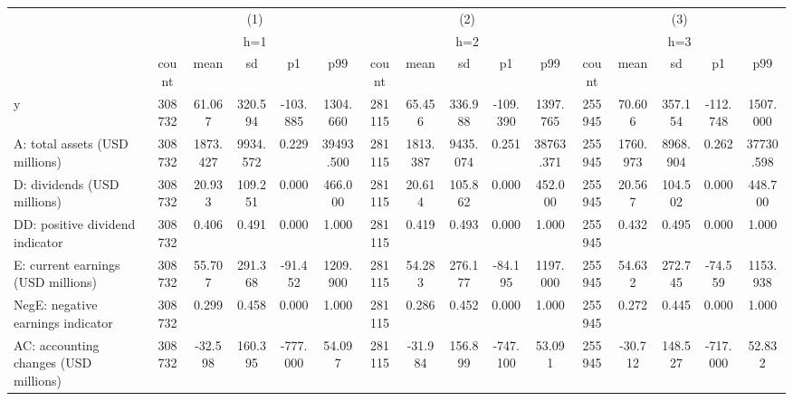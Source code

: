 \begin{tabular}{l*{3}{ccccc}}
\hline\hline
                    &\multicolumn{5}{c}{(1)}                                         &\multicolumn{5}{c}{(2)}                                         &\multicolumn{5}{c}{(3)}                                         \\
                    &\multicolumn{5}{c}{h=1}                                         &\multicolumn{5}{c}{h=2}                                         &\multicolumn{5}{c}{h=3}                                         \\
                    &       count&        mean&          sd&          p1&         p99&       count&        mean&          sd&          p1&         p99&       count&        mean&          sd&          p1&         p99\\
\hline
y                   &      308732&      61.067&     320.594&    -103.885&    1304.660&      281115&      65.456&     336.988&    -109.390&    1397.765&      255945&      70.606&     357.154&    -112.748&    1507.000\\
A: total assets (USD millions)&      308732&    1873.427&    9934.572&       0.229&   39493.500&      281115&    1813.387&    9435.074&       0.251&   38763.371&      255945&    1760.973&    8968.904&       0.262&   37730.598\\
D: dividends (USD millions)&      308732&      20.933&     109.251&       0.000&     466.000&      281115&      20.614&     105.862&       0.000&     452.000&      255945&      20.567&     104.502&       0.000&     448.700\\
DD: positive dividend indicator&      308732&       0.406&       0.491&       0.000&       1.000&      281115&       0.419&       0.493&       0.000&       1.000&      255945&       0.432&       0.495&       0.000&       1.000\\
E: current earnings (USD millions)&      308732&      55.707&     291.368&     -91.452&    1209.900&      281115&      54.283&     276.177&     -84.195&    1197.000&      255945&      54.632&     272.745&     -74.559&    1153.938\\
NegE: negative earnings indicator&      308732&       0.299&       0.458&       0.000&       1.000&      281115&       0.286&       0.452&       0.000&       1.000&      255945&       0.272&       0.445&       0.000&       1.000\\
AC: accounting changes (USD millions)&      308732&     -32.598&     160.395&    -777.000&      54.097&      281115&     -31.984&     156.899&    -747.100&      53.091&      255945&     -30.712&     148.527&    -717.000&      52.832\\

\end{tabular}
